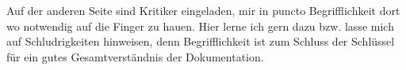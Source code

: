 Auf der anderen Seite sind Kritiker eingeladen, mir in puncto Begrifflichkeit dort wo notwendig auf die Finger zu hauen.
Hier lerne ich gern dazu bzw. lasse mich auf Schludrigkeiten hinweisen, denn Begrifflichkeit ist zum Schluss der Schl\"ussel f\"ur ein gutes Gesamtverst\"andnis der Dokumentation.